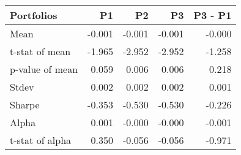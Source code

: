 \begin{tabular}{lrrrr}
\toprule
Portfolios & P1 & P2 & P3 & P3 - P1 \\
\midrule
Mean & -0.001 & -0.001 & -0.001 & -0.000 \\
t-stat of mean & -1.965 & -2.952 & -2.952 & -1.258 \\
p-value of mean & 0.059 & 0.006 & 0.006 & 0.218 \\
Stdev & 0.002 & 0.002 & 0.002 & 0.001 \\
Sharpe & -0.353 & -0.530 & -0.530 & -0.226 \\
Alpha & 0.001 & -0.000 & -0.000 & -0.001 \\
t-stat of alpha & 0.350 & -0.056 & -0.056 & -0.971 \\
\bottomrule
\end{tabular}
